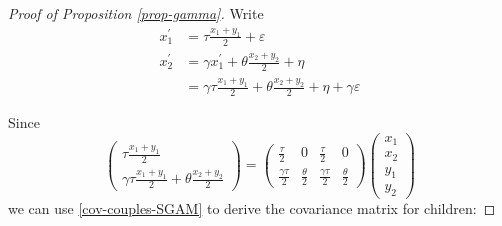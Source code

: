 \documentclass[
  12pt,
]{article}
\theoremstyle{definition}
\theoremstyle{definition}
\theoremstyle{definition}
\theoremstyle{definition}
\theoremstyle{remark}
\begin{document}
\begin{proof}[Proof of Proposition \ref{prop-gamma}]
Write
\begin{align*}
x_{1}^{\prime}  &=\tau\frac{x_{1}+y_{1}}{2}+\varepsilon \\
x_{2}^{\prime}  &=\gamma x_{1}^{\prime}+\theta\frac{x_{2}+y_{2}}{2}+\eta \\
                  &=\gamma\tau \frac{x_{1}+y_{1}}{2} + \theta \frac{x_{2}+y_{2}}{2} 
                    + \eta + \gamma\varepsilon
\end{align*}

Since
\[
\left(\begin{array}{c}
\tau\frac{x_{1}+y_{1}}{2}\\
\gamma\tau\frac{x_{1}+y_{1}}{2}+\theta\frac{x_{2}+y_{2}}{2}
\end{array}\right)=\left(\begin{array}{cccc}
\frac{\tau}{2} & 0 & \frac{\tau}{2} & 0\\
\frac{\gamma\tau}{2} & \frac{\theta}{2} & \frac{\gamma\tau}{2} & \frac{\theta}{2}
\end{array}\right)\left(\begin{array}{c}
x_{1}\\
x_{2}\\
y_{1}\\
y_{2}
\end{array}\right)
\]
we can use \eqref{cov-couples-SGAM} to derive the covariance matrix for children:


\end{proof}
\end{document}

